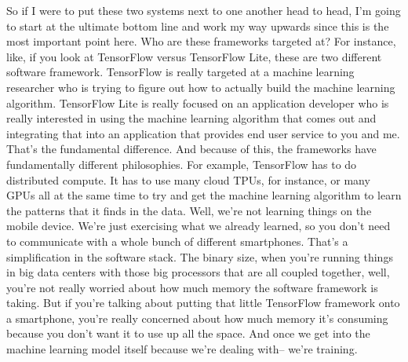 So if I were to put these two systems next to one another head to head, I'm going to start at the ultimate bottom line and work my way upwards since this is the most important point here.
Who are these frameworks targeted at?
For instance, like, if you look at TensorFlow versus TensorFlow Lite, these are two different software framework.
TensorFlow is really targeted at a machine learning researcher who is trying to figure out how to actually build the machine learning algorithm.
TensorFlow Lite is really focused on an application developer who is really interested in using the machine learning algorithm that comes out and integrating that into an application that provides end user service to you and me.
That's the fundamental difference.
And because of this, the frameworks have fundamentally different philosophies.
For example, TensorFlow has to do distributed compute.
It has to use many cloud TPUs, for instance, or many GPUs all at the same time to try and get the machine learning algorithm to learn the patterns that it finds in the data.
Well, we're not learning things on the mobile device.
We're just exercising what we already learned, so you don't need to communicate with a whole bunch of different smartphones.
That's a simplification in the software stack. The binary size, when you're running things in big data centers with those big processors that are all coupled together, well, you're not really worried about how much memory the software framework is taking.
But if you're talking about putting that little TensorFlow framework onto a smartphone, you're really concerned about how much memory it's consuming because you don't want it to use up all the space.
And once we get into the machine learning model itself because we're dealing with-- we're training.


